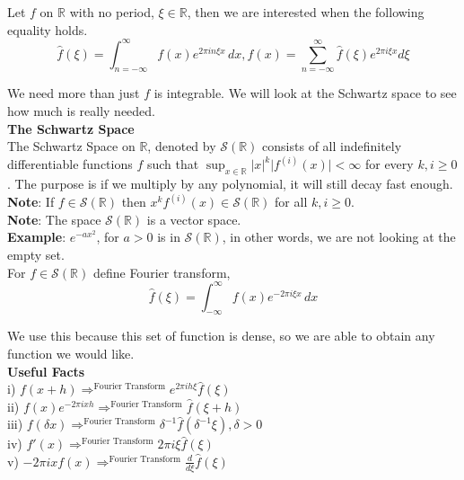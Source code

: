 \documentclass[12pt]{article}
\begin{document}
\noindent Let $f$ on $\mathbb{R}$ with no period, $\xi \in \mathbb{R}$, then we are interested when the following equality holds.
$$\hat{f}(\xi) = \int^\infty_{n=-\infty} f(x) e^{2\pi i n \xi x} \, dx, f(x) = \sum^\infty_{n=-\infty} \hat{f}(\xi) e^{2\pi i \xi x}d \xi$$

\noindent We need more than just $f$ is integrable. We will look at the Schwartz space to see how much is really needed. \\

\noindent \textbf{The Schwartz Space} \\
\noindent The Schwartz Space on $\mathbb{R}$, denoted by $\mathcal{S}(\mathbb{R})$ consists of all indefinitely differentiable functions $f$ such that $ \sup_{x\in \mathbb{R}}\vert x \vert^k \vert f^{(i)}(x) \vert < \infty$ for every $k, i \geq 0$. The purpose is if we multiply by any polynomial, it will still decay fast enough. \\

\noindent \textbf{Note}: If $f \in \mathcal{S}(\mathbb{R})$ then $x^kf^{(i)}(x) \in \mathcal{S}(\mathbb{R})$ for all $k,i \geq 0$.  \\

\noindent \textbf{Note}: The space $\mathcal{S}(\mathbb{R})$ is a vector space. \\
\noindent \textbf{Example}: $e^{-ax^2}$, for $a>0$ is in $\mathcal{S}(\mathbb{R})$, in other words, we are not looking at the empty set. \\

\noindent For $f \in \mathcal{S}(\mathbb{R})$ define Fourier transform, 
$$\hat{f}(\xi) = \int^{\infty}_{-\infty} f(x) e^{-2\pi i \xi x} \, dx$$

\noindent We use this because this set of function is dense, so we are able to obtain any function we would like.  \\

\noindent \textbf{Useful Facts} \\
\noindent i) $f(x+h) \Longrightarrow^{\text{Fourier Transform}} e^{2\pi ih \xi} \hat{f}(\xi)$ \\
\noindent ii) $f(x)e^{-2\pi ixh} \Longrightarrow^{\text{Fourier Transform}} \hat{f}(\xi + h)$ \\
\noindent iii) $f(\delta x) \Longrightarrow^{\text{Fourier Transform}} \delta^{-1}\hat{f}(\delta^{-1}\xi), \delta >0$ \\
\noindent iv) $f'(x) \Longrightarrow^{\text{Fourier Transform}} 2\pi i \xi \hat{f}(\xi)$ \\
\noindent v) $-2\pi ix f(x) \Longrightarrow^{\text{Fourier Transform}} \frac{d}{d\xi} \hat{f}(\xi)$
\end{document}
